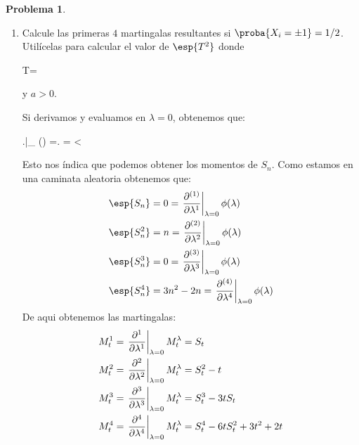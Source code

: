 \documentclass[a5paper,oneside]{amsart}
\theoremstyle{plain}
\theoremstyle{definition}
\newtheorem{problema}{Problema}
\begin{document}
\begin{problema}
\begin{enumerate}
\item Calcule las primeras $4$ martingalas resultantes si $\proba{X_i=\pm 1}=1/2$. Util\'icelas para calcular el valor de $\esp{T^2}$ donde\begin{esn}
T=\min{}
\end{esn}y $a>0$.

Si derivamos y evaluamos en $\lambda=0$, obtenemos que:
\begin{esn}
\left.\right|_{} \phi(\lambda) =\left. = < \infty
\end{esn}

Esto nos \'indica que podemos obtener los momentos de $S_n$. Como estamos en una caminata aleatoria obtenemos que:
\begin{align}
\esp{S_n}&=0= \left.\frac{\partial^{(1)}}{\partial\lambda^{1}} \right|_{\lambda=0}\phi(\lambda) \notag \\ \esp{S_n^2}&=n=\left.\frac{\partial^{(2)}}{\partial \lambda^{2}}\right|_{\lambda=0}\phi(\lambda) \notag \\ \esp{S_n^3}&=0=\left.\frac{\partial^{(3)}}{\partial \lambda^{3}}\right|_{\lambda=0} \phi(\lambda) \notag \\ \esp{S_n^4}&=3n^2-2n=\left.\frac{\partial^{(4)}}{\partial \lambda^{4}}\right|_{\lambda=0} \phi(\lambda)\notag
\end{align}
De aqui obtenemos las martingalas:
\begin{align}
M^1_t&=\left.\frac{\partial^1}{\partial \lambda^1}\right|_{\lambda=0}M^\lambda_t=S_t \notag \\ M^2_t&=\left.\frac{\partial^2}{\partial \lambda^2}\right|_{\lambda=0}M^\lambda_t=S_t^2-t \notag \\ M^3_t&=\left.\frac{\partial^3}{\partial \lambda^3}\right|_{\lambda=0}M^\lambda_t=S_t^3-3tS_t \notag \\
M^4_t&=\left.\frac{\partial^4}{\partial \lambda^4}\right|_{\lambda=0}M^\lambda_t=S_t^4-6tS_t^2+3t^2+2t \notag
\end{align}


\end{enumerate}
\end{problema}
\end{document}
